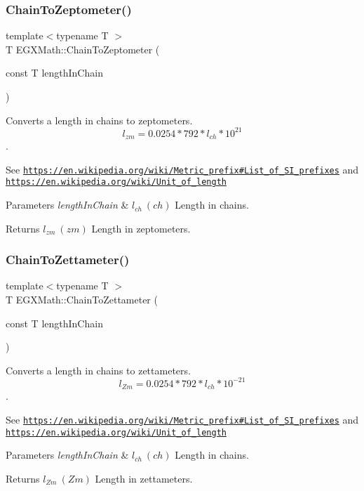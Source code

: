 \subsubsection{\texorpdfstring{Chain\+To\+Zeptometer()}{ChainToZeptometer()}}
{\footnotesize\ttfamily template$<$typename T $>$ \\
T E\+G\+X\+Math\+::\+Chain\+To\+Zeptometer (\begin{DoxyParamCaption}\item[{const T}]{length\+In\+Chain }\end{DoxyParamCaption})}



Converts a length in chains to zeptometers. \[ l_{zm}=0.0254 * 792 * l_{ch} * 10^{21} \]. 

See \href{https://en.wikipedia.org/wiki/Metric_prefix#List_of_SI_prefixes}{\tt https\+://en.\+wikipedia.\+org/wiki/\+Metric\+\_\+prefix\#\+List\+\_\+of\+\_\+\+S\+I\+\_\+prefixes} and \href{https://en.wikipedia.org/wiki/Unit_of_length}{\tt https\+://en.\+wikipedia.\+org/wiki/\+Unit\+\_\+of\+\_\+length} 
\begin{DoxyParams}{Parameters}
{\em length\+In\+Chain} & $ l_{ch}\ (ch)$ Length in chains. \\
\hline
\end{DoxyParams}
\begin{DoxyReturn}{Returns}
$ l_{zm}\ (zm)$ Length in zeptometers. 
\end{DoxyReturn}
\mbox{\label{group___e_g_x_math-_conversions-_length_conversions-_surveyors-_chain-_s_i_ga8fe1fdac139b7f842766aedd772527eb}} 
\subsubsection{\texorpdfstring{Chain\+To\+Zettameter()}{ChainToZettameter()}}
{\footnotesize\ttfamily template$<$typename T $>$ \\
T E\+G\+X\+Math\+::\+Chain\+To\+Zettameter (\begin{DoxyParamCaption}\item[{const T}]{length\+In\+Chain }\end{DoxyParamCaption})}



Converts a length in chains to zettameters. \[ l_{Zm}=0.0254 * 792 * l_{ch} * 10^{-21} \]. 

See \href{https://en.wikipedia.org/wiki/Metric_prefix#List_of_SI_prefixes}{\tt https\+://en.\+wikipedia.\+org/wiki/\+Metric\+\_\+prefix\#\+List\+\_\+of\+\_\+\+S\+I\+\_\+prefixes} and \href{https://en.wikipedia.org/wiki/Unit_of_length}{\tt https\+://en.\+wikipedia.\+org/wiki/\+Unit\+\_\+of\+\_\+length} 
\begin{DoxyParams}{Parameters}
{\em length\+In\+Chain} & $ l_{ch}\ (ch)$ Length in chains. \\
\hline
\end{DoxyParams}
\begin{DoxyReturn}{Returns}
$ l_{Zm}\ (Zm)$ Length in zettameters. 
\end{DoxyReturn}
